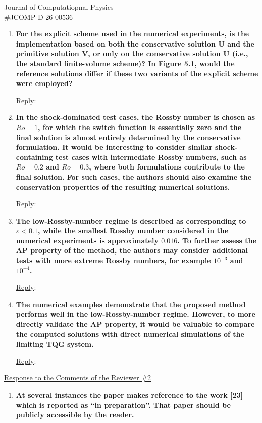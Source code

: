 \documentclass[letter,11pt]{letter}
\begin{document}
\begin{letter}{Journal of Computatiopnal Physics\\\#JCOMP-D-26-00536}
\begin{enumerate}
	\medskip
	\item
	{\bf For the explicit scheme used in the numerical experiments, is the implementation based on both the conservative solution $\bm{U}$ and the primitive solution $\bm{V}$, or only on the conservative solution $\bm{U}$ (i.e., the standard finite-volume scheme)? In Figure 5.1, would the reference solutions differ if these two variants of the explicit scheme were employed?}
	
	\medskip
	{\sc\underline{Reply}}: 
	
	\medskip
	\item
	{\bf In the shock-dominated test cases, the Rossby number is chosen as $Ro = 1$, for which the switch function is essentially zero and the final solution is almost entirely determined by the conservative formulation. It would be interesting to consider similar shock-containing test cases with intermediate Rossby numbers, such as $Ro = 0.2$ and $Ro = 0.3$, where both formulations contribute to the final solution. For such cases, the authors should also examine the conservation properties of the resulting numerical solutions.}
	
	\medskip
	{\sc\underline{Reply}}:
	
	\medskip
	\item
	{\bf The low-Rossby-number regime is described as corresponding to $\varepsilon < 0.1$, while the smallest Rossby number considered in the numerical experiments is approximately $0.016$. To further assess the AP property of the method, the authors may consider additional tests with more extreme Rossby numbers, for example $10^{-3}$ and $10^{-4}$.}
	
	\medskip
	{\sc\underline{Reply}}:
	
	\medskip
	\item
	{\bf The numerical examples demonstrate that the proposed method performs well in the low-Rossby-number regime. However, to more directly validate the AP property, it would be valuable to compare the computed solutions with direct numerical simulations of the limiting TQG system.}
	
	\medskip
	{\sc\underline{Reply}}:
\end{enumerate}

\bigskip
\underline{Response to the Comments of the Reviewer \#2}
\begin{enumerate}
\item
{\bf At several instances the paper makes reference to the work [23] which is reported as ``in preparation''. That paper should be publicly accessible by the reader.}


\end{enumerate}
\end{letter}
\end{document}
